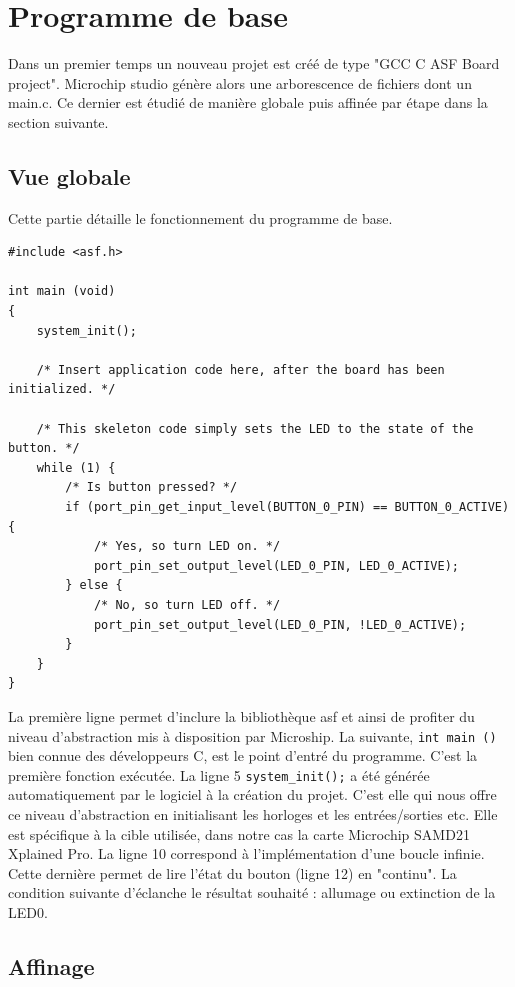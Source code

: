 \documentclass[a4paper]{article}
\begin{document}
\newpage

\section{Programme de base} %

Dans un premier temps un nouveau projet est créé de type "GCC C ASF Board project". Microchip studio génère alors une arborescence de fichiers dont un main.c. Ce dernier est étudié de manière globale puis affinée par étape dans la section suivante.

\subsection{Vue globale}
Cette partie détaille le fonctionnement du programme de base. 


\begin{lstlisting}[style=CStyle]
#include <asf.h>

int main (void)
{
	system_init();
	
	/* Insert application code here, after the board has been initialized. */
	
	/* This skeleton code simply sets the LED to the state of the button. */
	while (1) {
		/* Is button pressed? */
		if (port_pin_get_input_level(BUTTON_0_PIN) == BUTTON_0_ACTIVE) {
			/* Yes, so turn LED on. */
			port_pin_set_output_level(LED_0_PIN, LED_0_ACTIVE);
		} else {
			/* No, so turn LED off. */
			port_pin_set_output_level(LED_0_PIN, !LED_0_ACTIVE);
		}
	}
}
\end{lstlisting}
La première ligne permet d'inclure la  bibliothèque asf et ainsi de profiter du niveau d'abstraction mis à disposition par Microship. La suivante, \texttt{int main ()} bien connue des développeurs C, est le point d'entré du programme. C'est la première fonction exécutée. La ligne 5 \texttt{system\_init();} a été générée automatiquement par le logiciel à la création du projet. C'est elle qui nous offre ce niveau d'abstraction en initialisant les horloges et les entrées/sorties etc. Elle est spécifique à la cible utilisée, dans notre cas la carte Microchip SAMD21 Xplained Pro. La ligne 10 correspond à l'implémentation d'une boucle infinie. Cette dernière permet de lire l'état du bouton (ligne 12) en "continu". La condition suivante d’éclanche le résultat souhaité : allumage ou extinction de la LED0.

\subsection{Affinage}
\end{document}
